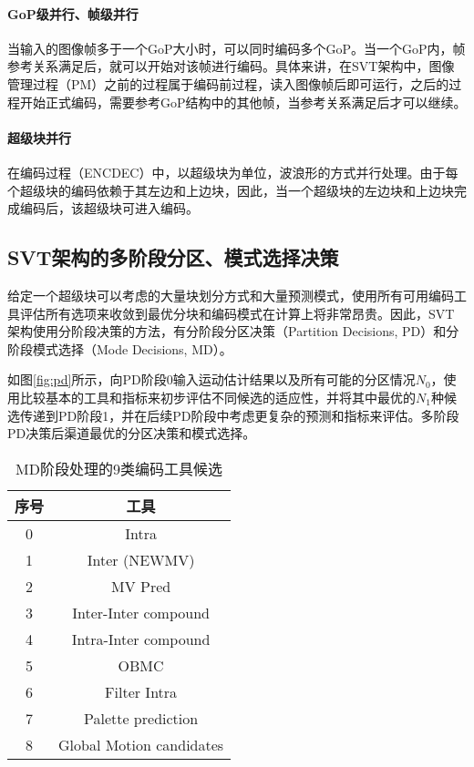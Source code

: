   \paragraph{GoP级并行、帧级并行} 当输入的图像帧多于一个GoP大小时，可以同时编码多个GoP。当一个GoP内，帧参考关系满足后，就可以开始对该帧进行编码。具体来讲，在SVT架构中，图像管理过程（PM）之前的过程属于编码前过程，读入图像帧后即可运行，之后的过程开始正式编码，需要参考GoP结构中的其他帧，当参考关系满足后才可以继续。
  \paragraph{超级块并行} 在编码过程（ENCDEC）中，以超级块为单位，波浪形的方式并行处理。由于每个超级块的编码依赖于其左边和上边块，因此，当一个超级块的左边块和上边块完成编码后，该超级块可进入编码。

  \subsection{SVT架构的多阶段分区、模式选择决策} \label{sec:pd-md}
  给定一个超级块可以考虑的大量块划分方式和大量预测模式，使用所有可用编码工具评估所有选项来收敛到最优分块和编码模式在计算上将非常昂贵。因此，SVT架构使用分阶段决策的方法\cite{EncoderDesignSVTAV1}，有分阶段分区决策（Partition Decisions, PD）和分阶段模式选择（Mode Decisions, MD）。

  如图\ref{fig:pd}所示，向PD阶段0输入运动估计结果以及所有可能的分区情况$N_0$，使用比较基本的工具和指标来初步评估不同候选的适应性，并将其中最优的$N_1$种候选传递到PD阶段1，并在后续PD阶段中考虑更复杂的预测和指标来评估。多阶段PD决策后渠道最优的分区决策和模式选择。

  \begin{table}[!hpt]
    \renewcommand{\arraystretch}{0.8}
    \caption{MD阶段处理的9类编码工具候选}
    \label{tab:av1-classes}
    \centering
    \begin{tabular}{cc} \toprule
      序号    & 工具 \\ \midrule
      0& Intra \\
      1& Inter (NEWMV) \\
      2& MV Pred  \\
      3& Inter-Inter compound \\
      4& Intra-Inter compound \\
      5& OBMC \\
      6& Filter Intra \\
      7& Palette prediction \\
      8& Global Motion candidates \\\bottomrule
    \end{tabular}
  \end{table}

